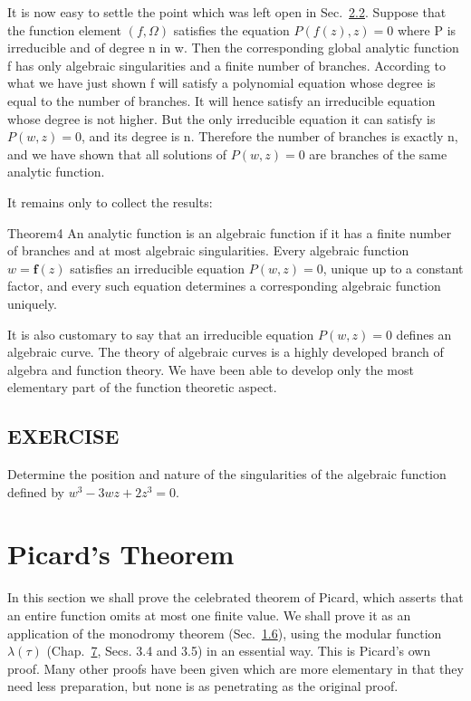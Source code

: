 It is now easy to settle the point which was left open in Sec.~\hyperref[sec:8.2.2]{2.2}. Suppose that the function element $(f,\Omega)$ satisfies the equation $P(f(z),z)=0$ where P is irreducible and of degree n in w. Then the corresponding global analytic function f has only algebraic singularities and a finite number of branches. According to what we have just shown f will satisfy a polynomial equation whose degree is equal to the number of branches. It will hence satisfy an irreducible equation whose degree is not higher. But the only irreducible equation it can satisfy is $P(w,z)=0$, and its degree is n. Therefore the number of branches is exactly n, and we have shown that all solutions of $P(w,z)=0$ are branches of the same analytic function.

It remains only to collect the results:

\begin{originalstatement}{Theorem}{4}\label{thm:8.4}
An analytic function is an algebraic function if it has a finite number of branches and at most algebraic singularities. Every algebraic function $w = \mathbf{f}(z)$ satisfies an irreducible equation $P(w, z) = 0$, unique up to a constant factor, and every such equation determines a corresponding algebraic function uniquely.
\end{originalstatement}
It is also customary to say that an irreducible equation $P(w,z)=0$ defines an algebraic curve. The theory of algebraic curves is a highly developed branch of algebra and function theory. We have been able to develop only the most elementary part of the function theoretic aspect.

\subsection*{EXERCISE}
Determine the position and nature of the singularities of the algebraic function defined by $w^{3} - 3wz + 2z^{3} = 0$.

\setcounter{section}{2}\section{Picard's Theorem}\label{sec:8.3}
In this section we shall prove the celebrated theorem of Picard, which asserts that an entire function omits at most one finite value. We shall
prove it as an application of the monodromy theorem (Sec.~\hyperref[sec:8.1.6]{1.6}), using the modular function $\lambda(\tau)$ (Chap.~\hyperref[chap:7]{7}, Secs. 3.4 and 3.5) in an essential way. This is Picard's own proof. Many other proofs have been given which are more elementary in that they need less preparation, but none is as penetrating as the original proof.

